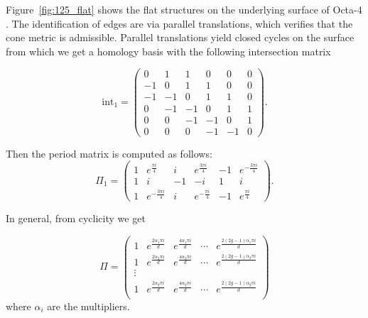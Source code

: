 \documentclass[12pt,reqno]{amsart}
\theoremstyle{definition}
\theoremstyle{remark}
\begin{document}
Figure~\ref{fig:125_flat} shows the flat structures on the underlying surface of Octa-4 \cite{dami}. The identification of edges are via parallel translations, which verifies that the cone metric is admissible. Parallel translations yield closed cycles on the surface from which we get a homology basis with the following intersection matrix

$$\textrm{int}_1 = \begin{pmatrix} 0 & 1 & 1 & 0 & 0 & 0 \\
 -1 & 0 & 1 & 1 & 0 & 0 \\
 -1 & -1 & 0 & 1 & 1 & 0 \\
 0 & -1 & -1 & 0 & 1 & 1 \\
 0 & 0 & -1 & -1 & 0 & 1 \\
 0 & 0 & 0 & -1 & -1 & 0 \end{pmatrix}.$$

Then the period matrix is computed as follows: 
$$\Pi_1 = \left(
\begin{array}{cccccc}
 1 & e^{\frac{\pi i}{4}} & i & e^{\frac{3 \pi i}{4}} & -1 & e^{-\frac{3 \pi i}{4}} \\
 1 & i & -1 & -i & 1 & i \\
 1 & e^{-\frac{3 \pi i}{4}} & i & e^{-\frac{\pi i}{4}} & -1 & e^{\frac{\pi i}{4}} 
\end{array}
\right).$$


In general, from cyclicity we get 

$$\Pi = \left(
\begin{array}{ccccc}
 1 & e^{\frac{2 \alpha_1 \pi i}{d}} & e^{\frac{4 \alpha_1 \pi i}{d}} & \cdots & e^{\frac{2 (2 g - 1) \alpha_1 \pi i}{d}} \\
 1 & e^{\frac{2 \alpha_2 \pi i}{d}} & e^{\frac{4 \alpha_2 \pi i}{d}} & \cdots & e^{\frac{2 (2 g - 1) \alpha_2 \pi i}{d}} \\
 \vdots\\
 1 & e^{\frac{2 \alpha_g \pi i}{d}} & e^{\frac{4 \alpha_g \pi i}{d}} & \cdots & e^{\frac{2 (2 g - 1) \alpha_g \pi i}{d}} \\
\end{array}
\right)$$
where $\alpha_i$ are the multipliers.
\end{document}

